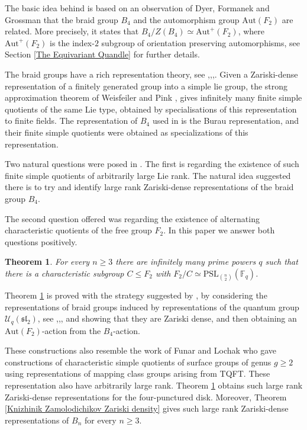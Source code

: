 \documentclass[letterpaper]{amsart}
\newtheorem{theorem}{Theorem}[section]
\begin{document}
The basic idea behind \cite{chen2025finite} is based on an observation of Dyer, Formanek and Grossman \cite{dyer1982linearity} that the braid group $B_4$ and the automorphism group $\mathrm{Aut}(F_2)$ are related. More precisely, it states that $B_4 / Z(B_4) \simeq \mathrm{Aut}^+(F_2)$, where $\mathrm{Aut}^+(F_2)$ is the index-$2$ subgroup of orientation preserving automorphisms, see Section \ref{The Equivariant Quandle} for further details.

The braid groups have a rich representation theory, see \cite{krammer2000braid},\cite{bigelow2001braid},\cite{krammer2002braid},\cite{abad2014introduction}. Given a Zariski-dense representation of a finitely generated group into a simple lie group, the strong approximation theorem of Weisfeiler and Pink \cite{weisfeiler1984strong},\cite{pink2000strong} gives infinitely many finite simple quotients of the same Lie type, obtained by specialisations of this representation to finite fields. The representation of $B_4$ used in \cite{chen2025finite} is the Burau representation, and their finite simple quotients were obtained as specializations of this representation.

Two natural questions were posed in \cite{chen2025finite}. The first is regarding the existence of such finite simple quotients of arbitrarily large Lie rank. The natural idea suggested there is to try and identify large rank Zariski-dense representations of the braid group $B_4$.

The second question offered was regarding the existence of alternating characteristic quotients of the free group $F_2$. In this paper we answer both questions positively.
\begin{theorem}
\label{Large rank quotients}
    For every $n \geq 3$ there are infinitely many prime powers $q$ such that there is a characteristic subgroup $C \leq F_2$ with $F_2 / C \simeq \mathrm{PSL}_{\binom{n}{2}}(\mathbb{F}_q)$.
\end{theorem}
Theorem \ref{Large rank quotients} is proved with the strategy suggested by \cite{chen2025finite}, by considering the representations of braid groups induced by representations of the quantum group $\mathcal{U}_q(\mathfrak{sl}_2)$, see \cite{jackson2011lawrence},\cite{kassel2012quantum},\cite{abad2014introduction}, and showing that they are Zariski dense, and then obtaining an $\mathrm{Aut}(F_2)$-action from the $B_4$-action.

These constructions also resemble the work of Funar and Lochak \cite{funar2018profinite} who gave constructions of characteristic simple quotients of surface groups of genus $g \geq 2$ using representations of mapping class groups arising from TQFT. These representation also have arbitrarily large rank. Theorem \ref{Large rank quotients} obtains such large rank Zariski-dense representations for the four-punctured disk. Moreover, Theorem \ref{Knizhinik Zamolodichikov Zariski density} gives such large rank Zariski-dense representations of $B_n$ for every $n \geq 3$.
\end{document}
